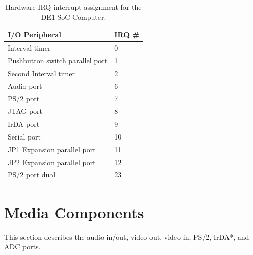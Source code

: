 \documentclass[11pt, twoside, pdftex]{article}
\newcommand{\commonFiles}{../../../common/doc}
\begin{document}


\begin{table}[h]
    \begin{center}
    \begin{tabular}{l|l}
            \textbf{I/O Peripheral} &
            \textbf{IRQ \#}
        \\\hline
            Interval timer & 0
        \\
            Pushbutton switch parallel port & 1
        \\
            Second Interval timer & 2
        \\
            Audio port & 6
        \\
            PS/2 port & 7
        \\
            JTAG port & 8
        \\
						IrDA port & 9
				\\
            Serial port & 10
        \\
            JP1 Expansion parallel port & 11
        \\
            JP2 Expansion parallel port & 12
        \\
						PS/2 port dual & 23
				\\
    \end{tabular}
    \caption{Hardware IRQ interrupt assignment for the DE1-SoC Computer.}
	 \label{tab:irq}
    \end{center}
\end{table}
\newpage









\section{Media Components}
\label{sec:multi}

This section describes the audio in/out, video-out, video-in, PS/2, IrDA*, and ADC ports.









\end{document}
